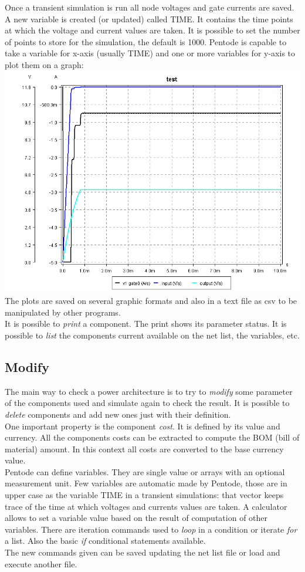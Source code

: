 \documentclass[12pt,a4paper]{book}
\begin{document}
Once a transient simulation is run all node voltages and gate currents are saved. A new variable is created (or updated) called TIME. It contains the time points at which the voltage and current values are taken. It is possible to set the number of points to store for the simulation, the default is 1000. Pentode is capable to take a variable for x-axis (usually TIME) and one or more variables for y-axis to plot them on a graph:\\
\includegraphics[width=\textwidth]{test.png}\\
The plots are saved on several graphic formats and also in a text file as csv to be manipulated by other programs.\\
It is possible to \emph{print} a component. The print shows its parameter status. It is possible to \emph{list} the components current available on the net list, the variables, etc.  
\subsection{Modify}
The main way to check a power architecture is to try to \emph{modify} some parameter of the components used and simulate again to check the result. It is possible to \emph{delete} components and add new ones just with their definition.\\
One important property is the component \emph{cost}. It is defined by its value and currency. All the components costs can be extracted to compute the BOM (bill of material) amount. In this context all costs are converted to the base currency value.\\
Pentode can define variables. They are single value or arrays with an optional measurement unit. Few variables are automatic made by Pentode, those are in upper case as the variable TIME in a transient simulations: that vector keeps trace of the time at which voltages and currents values are taken. A calculator allows to set a variable value based on the result of computation of other variables. 
There are iteration commands used to \emph{loop} in a condition or iterate \emph{for} a list. Also the basic \emph{if} conditional statements available. \\
The new commands given can be saved updating the net list file or load and execute another file.\\
\end{document}
